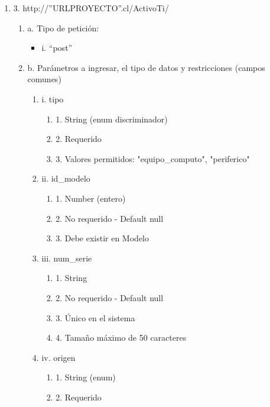 \begin{enumerate}
    \item 3. http://”URLPROYECTO”.cl/ActivoTi/
    \begin{enumerate}
        \item a. Tipo de petición:
            \begin{itemize}
               \item i. “post”
            \end{itemize}
        \item b. Parámetros a ingresar, el tipo de datos y restricciones (campos comunes)
            \begin{enumerate}
                \item i. tipo
                    \begin{enumerate}
                        \item 1. String (enum discriminador)
                        \item 2. Requerido
                        \item 3. Valores permitidos: "equipo\_computo", "periferico"
                    \end{enumerate}
                \item ii. id\_modelo
                    \begin{enumerate}
                        \item 1. Number (entero)
                        \item 2. No requerido - Default null
                        \item 3. Debe existir en Modelo
                    \end{enumerate}
                \item iii. num\_serie
                    \begin{enumerate}
                        \item 1. String
                        \item 2. No requerido - Default null
                        \item 3. Único en el sistema
                        \item 4. Tamaño máximo de 50 caracteres
                    \end{enumerate}
                \item iv. origen
                    \begin{enumerate}
                        \item 1. String (enum)
                        \item 2. Requerido

\end{enumerate}
\end{enumerate}
\end{enumerate}
\end{enumerate}
